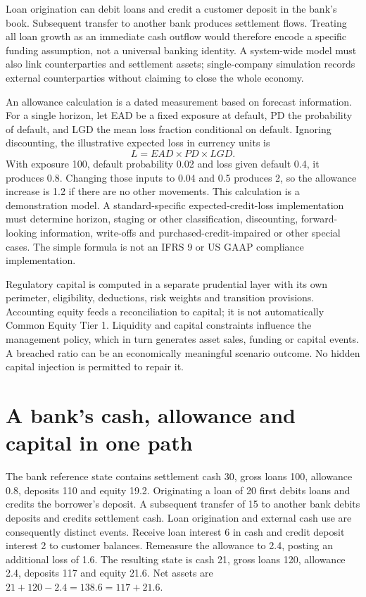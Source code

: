 Loan origination can debit loans and credit a customer deposit in the bank's
book. Subsequent transfer to another bank produces settlement flows. Treating
all loan growth as an immediate cash outflow would therefore encode a specific
funding assumption, not a universal banking identity. A system-wide model must
also link counterparties and settlement assets; single-company simulation
records external counterparties without claiming to close the whole economy.

\newpage
An allowance calculation is a dated measurement based on forecast information.
For a single horizon, let EAD be a fixed exposure at default, PD the probability
of default, and LGD the mean loss fraction conditional on default. Ignoring
discounting, the illustrative expected loss in currency units is
\[
 L=EAD\times PD\times LGD.
\]
With exposure 100, default probability 0.02 and loss given default 0.4, it
produces 0.8. Changing those inputs to 0.04 and 0.5 produces 2, so the allowance
increase is 1.2 if there are no other movements. This calculation is a
demonstration model. A standard-specific expected-credit-loss implementation
must determine horizon, staging or other classification, discounting,
forward-looking information, write-offs and purchased-credit-impaired or
other special cases. The simple formula is not an IFRS 9 or US GAAP compliance
implementation.

Regulatory capital is computed in a separate prudential layer with its own
perimeter, eligibility, deductions, risk weights and transition provisions.
Accounting equity feeds a reconciliation to capital; it is not automatically
Common Equity Tier 1. Liquidity and capital constraints influence the
management policy, which in turn generates asset sales, funding or capital
events. A breached ratio can be an economically meaningful scenario outcome.
No hidden capital injection is permitted to repair it.

\section{A bank's cash, allowance and capital in one path}

The bank reference state contains settlement cash 30, gross loans 100,
allowance 0.8, deposits 110 and equity 19.2. Originating a loan of 20 first
debits loans and credits the borrower's deposit. A subsequent transfer of 15
to another bank debits deposits and credits settlement cash. Loan origination
and external cash use are consequently distinct events. Receive loan interest
6 in cash and credit deposit interest 2 to customer balances. Remeasure the
allowance to 2.4, posting an additional loss of 1.6. The resulting state is
cash 21, gross loans 120, allowance 2.4, deposits 117 and equity 21.6.
Net assets are $21+120-2.4=138.6=117+21.6$.

